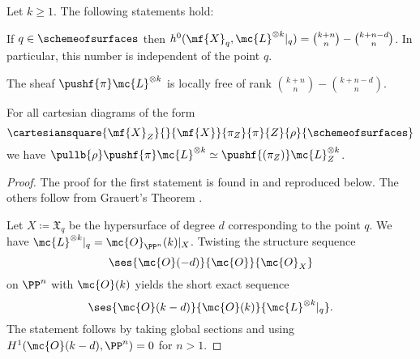 \begin{proposition} \label{verlinde-base-change}
	Let $k\geq 1$. The following statements hold:

	\begin{enumerate}
	\huyitem If $q\in \schemeofsurfaces$ then
	$h^0 ( \mf{X}_q, \mc{L}^{\otimes k}|_q) = \binom{k+n}{n} - \binom{k+n-d}{n}$.
	In particular, this number is independent of the point $q$.

	\huyitem The sheaf
	$\pushf{\pi}\mc{L}^{\otimes k}$
	is locally free of rank
	$\binom{k+n}{n} - \binom{k+n-d}{n}$.

	\huyitem For all cartesian diagrams of the form 
	\[
	\cartesiansquare{\mf{X}_{Z}}{}{\mf{X}}{\pi_Z}{\pi}{Z}{\rho}{\schemeofsurfaces}
	\]
	we have
	$\pullb{\rho}\pushf{\pi}\mc{L}^{\otimes k}
	\simeq
	\pushf{(\pi_Z)}\mc{L}^{\otimes k}_Z$.
	\end{enumerate}
\end{proposition}

\begin{proof}
	The proof for the first statement is found in
	\cite[Proposition 4.1]{hemminghaus-verlinde-bundles}
	and reproduced below. The others follow from Grauert's Theorem
	\cite[{}28.1.5]{vakil-algebraic-geometry}.

	Let $X\coloneqq \mathfrak X_q$ be the hypersurface of degree $d$ corresponding to the point $q$. We have $\mc{L}^{\otimes k}|_q = \mc{O}_{\PP^n}(k)|_{X}$. Twisting the structure sequence
	\[\ses{\mc{O}(-d)}{\mc{O}}{\mc{O}_{X}}\]
	on $\PP^n$
	with $\mc{O}(k)$ yields the short exact sequence
	\[\ses{\mc{O}(k-d)}{\mc{O}(k)}{\mc{L}^{\otimes k}|_q}.\]
	The statement follows by taking global sections and using $H^1(\mc{O}(k-d),\PP^n)=0$ for $n>1$.
\end{proof}
